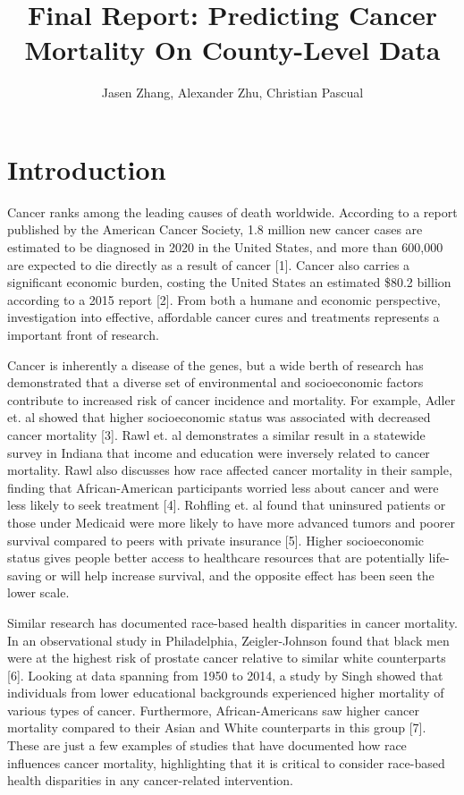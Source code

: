 \documentclass[
  11pt,
]{article}
\title{Final Report: Predicting Cancer Mortality On County-Level Data}
\author{Jasen Zhang, Alexander Zhu, Christian Pascual}
\date{}
\begin{document}
\maketitle

\hypertarget{introduction}{%
\section{Introduction}\label{introduction}}

Cancer ranks among the leading causes of death worldwide. According to a
report published by the American Cancer Society, 1.8 million new cancer
cases are estimated to be diagnosed in 2020 in the United States, and
more than 600,000 are expected to die directly as a result of cancer
{[}1{]}. Cancer also carries a significant economic burden, costing the
United States an estimated \$80.2 billion according to a 2015 report
{[}2{]}. From both a humane and economic perspective, investigation into
effective, affordable cancer cures and treatments represents a important
front of research.

Cancer is inherently a disease of the genes, but a wide berth of
research has demonstrated that a diverse set of environmental and
socioeconomic factors contribute to increased risk of cancer incidence
and mortality. For example, Adler et. al showed that higher
socioeconomic status was associated with decreased cancer mortality
{[}3{]}. Rawl et. al demonstrates a similar result in a statewide survey
in Indiana that income and education were inversely related to cancer
mortality. Rawl also discusses how race affected cancer mortality in
their sample, finding that African-American participants worried less
about cancer and were less likely to seek treatment {[}4{]}. Rohfling
et. al found that uninsured patients or those under Medicaid were more
likely to have more advanced tumors and poorer survival compared to
peers with private insurance {[}5{]}. Higher socioeconomic status gives
people better access to healthcare resources that are potentially
life-saving or will help increase survival, and the opposite effect has
been seen the lower scale.

Similar research has documented race-based health disparities in cancer
mortality. In an observational study in Philadelphia, Zeigler-Johnson
found that black men were at the highest risk of prostate cancer
relative to similar white counterparts {[}6{]}. Looking at data spanning
from 1950 to 2014, a study by Singh showed that individuals from lower
educational backgrounds experienced higher mortality of various types of
cancer. Furthermore, African-Americans saw higher cancer mortality
compared to their Asian and White counterparts in this group {[}7{]}.
These are just a few examples of studies that have documented how race
influences cancer mortality, highlighting that it is critical to
consider race-based health disparities in any cancer-related
intervention.
\end{document}
